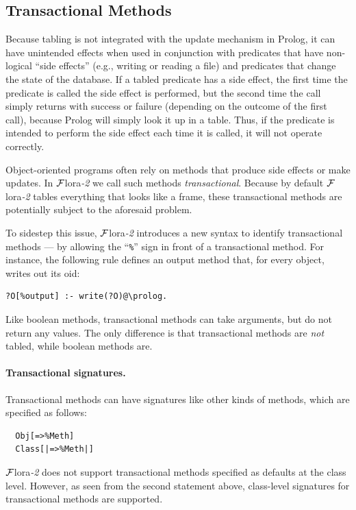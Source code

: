 \documentclass[11pt]{article}
\newcommand{\FLORA}{{\mbox{\sc ${\cal F}${lora}\rm\emph{-2}}}\xspace}
\newcommand{\FLSYSTEM}{\FLORA}
\begin{document}
\subsection{Transactional Methods}\label{sec-proc-methods}

%
Because tabling is not integrated with the update mechanism in Prolog, it can
have unintended effects when used in conjunction with
predicates that have non-logical ``side effects''
(e.g., writing or reading a file) and predicates that change the state of
the database.  If a tabled predicate has a side effect, the first time the
predicate is called the side effect is performed, but the second time the
call simply returns with success or failure (depending on the outcome of
the first call), because Prolog will simply look it up in a table.  Thus, if
the predicate is intended to perform the side effect each time it is
called, it will not operate correctly.

Object-oriented programs often rely on methods that produce side effects
or make updates.  In \FLSYSTEM we call such methods 
\emph{transactional}.
Because by default \FLSYSTEM tables everything that looks like a frame,
these transactional methods are potentially subject to the aforesaid problem.

To sidestep this issue, \FLSYSTEM introduces a new syntax to identify
transactional methods --- by allowing the ``\verb|%|'' sign in front of a
transactional method. For instance, the following rule defines an output
method that, for every object, writes out its oid:
\begin{verbatim}
?O[%output] :- write(?O)@\prolog.
\end{verbatim}
Like boolean methods, transactional methods can take arguments, but do not
return any values.  The only difference is that transactional methods are
\emph{not} tabled, while boolean methods are.

\paragraph{Transactional signatures.}
Transactional methods can have signatures like other kinds of methods, which
are specified as follows:
\begin{verbatim}
  Obj[=>%Meth]
  Class[|=>%Meth|]
\end{verbatim}
\FLSYSTEM does not support transactional methods specified as defaults at the
class level. However, as seen from the second statement above, class-level
signatures for transactional methods are supported.
\begin{verbatim}
\end{verbatim}
\end{document}
